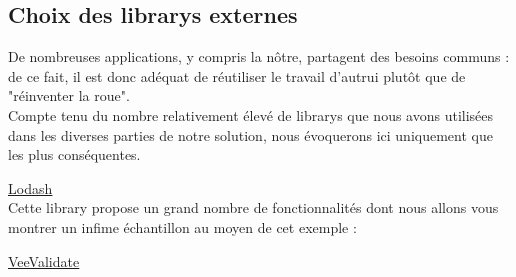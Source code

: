 \subsection*{Choix des \glspl{library} externes}

De nombreuses applications, y compris la nôtre, partagent des besoins communs : de ce fait, il est donc adéquat de réutiliser le travail d'autrui plutôt que de "réinventer la roue". \\

Compte tenu du nombre relativement élevé de \glspl{library} que nous avons utilisées dans les diverses parties de notre solution, nous évoquerons ici uniquement que les plus conséquentes. \\







\underline{\href{https://lodash.com/}{Lodash}}\\

Cette \gls{library} propose un grand nombre de fonctionnalités dont nous allons vous montrer un infime échantillon au moyen de cet exemple :



\pagebreak
{}

\noindent\underline{\href{https://logaretm.github.io/vee-validate/}{VeeValidate}}\\

